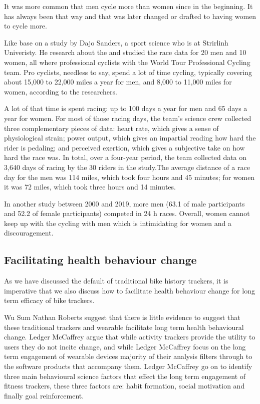 \documentclass{l4proj}
\begin{document}
It was more common that men cycle more than women since in the beginning. It has always been that way and that was later changed or drafted to having women to cycle more. 

\cite{sanders2019intensity} Like base on a study by Dajo Sanders, a sport science who is at Strirlinh Univeristy. He research about the and studied the race data for 20 men and 10 women, all where professional cyclists with the World Tour Professional Cycling team. Pro cyclists, needless to say, spend a lot of time cycling, typically covering about 15,000 to 22,000 miles a year for men, and 8,000 to 11,000 miles for women, according to the researchers.

 A lot of that time is spent racing: up to 100 days a year for men and 65 days a year for women. For most of those racing days, the team’s science crew collected three complementary pieces of data: heart rate, which gives a sense of physiological strain; power output, which gives an impartial reading how hard the rider is pedaling; and perceived exertion, which gives a subjective take on how hard the race was.
 In total, over a four-year period, the team collected data on 3,640 days of racing by the 30 riders in the study.The average distance of a race day for the men was 114 miles, which took four hours and 45 minutes; for women it was 72 miles, which took three hours and 14 minutes.
 
 \cite{van2019training}In another study between 2000 and 2019, more men (63.1 of male participants and 52.2 of female participants) competed in 24 h races. Overall, women cannot keep up with the cycling with men which is intimidating for women and a discouragement.




\subsection{Facilitating health behaviour change}\label{healthbehaviourchange}

As we have discussed the default of traditional bike history trackers, it is imperative that we also discuss how to facilitate health behaviour change for long term efficacy of bike trackers. 

\cite{van2019training} Wu Sum Nathan Roberts suggest that there is little evidence to suggest that these traditional trackers and wearable facilitate long term health behavioural change. \cite{gidaris2019surveillance} Ledger McCaffrey  argue that while activity trackers provide the utility to users they do not incite change,  and while \cite{lemos2019move} Ledger McCaffrey focus on the long term engagement of wearable devices majority of their analysis filters through to the software products that accompany them. \cite{lemos2019move} Ledger McCaffrey go on to identify three main behavioural science factors that effect the long term engagement of fitness trackers, these three factors are: habit formation, social motivation and finally goal reinforcement. 
\end{document}
